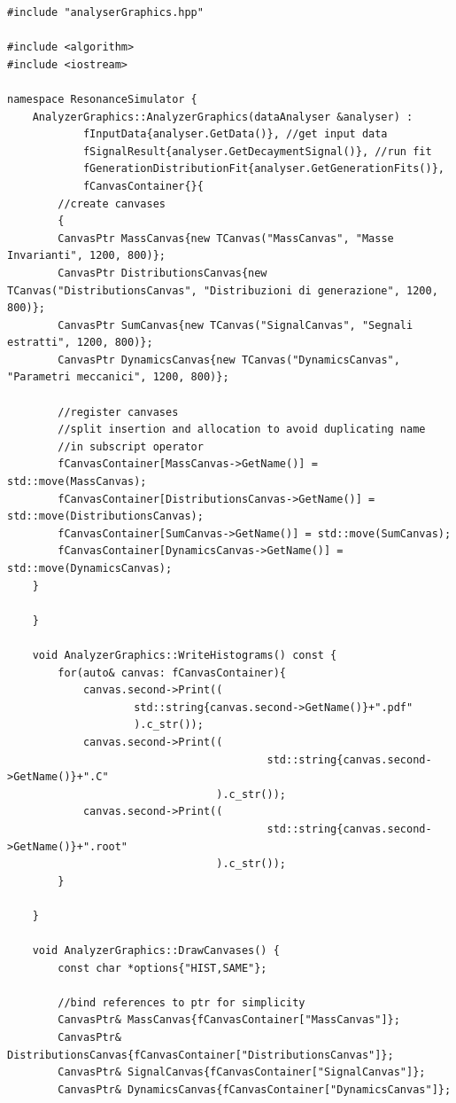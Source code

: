 \documentclass[12pt, a4paper]{article}
\begin{document}
\begin{verbatim}
#include "analyserGraphics.hpp"

#include <algorithm>
#include <iostream>

namespace ResonanceSimulator {
    AnalyzerGraphics::AnalyzerGraphics(dataAnalyser &analyser) :
            fInputData{analyser.GetData()}, //get input data
            fSignalResult{analyser.GetDecaymentSignal()}, //run fit
            fGenerationDistributionFit{analyser.GetGenerationFits()},
            fCanvasContainer{}{
        //create canvases
        {
        CanvasPtr MassCanvas{new TCanvas("MassCanvas", "Masse Invarianti", 1200, 800)};
        CanvasPtr DistributionsCanvas{new TCanvas("DistributionsCanvas", "Distribuzioni di generazione", 1200, 800)};
        CanvasPtr SumCanvas{new TCanvas("SignalCanvas", "Segnali estratti", 1200, 800)};
        CanvasPtr DynamicsCanvas{new TCanvas("DynamicsCanvas", "Parametri meccanici", 1200, 800)};

        //register canvases
        //split insertion and allocation to avoid duplicating name
        //in subscript operator
        fCanvasContainer[MassCanvas->GetName()] = std::move(MassCanvas);
        fCanvasContainer[DistributionsCanvas->GetName()] = std::move(DistributionsCanvas);
        fCanvasContainer[SumCanvas->GetName()] = std::move(SumCanvas);
        fCanvasContainer[DynamicsCanvas->GetName()] = std::move(DynamicsCanvas);
    }

    }

    void AnalyzerGraphics::WriteHistograms() const {
        for(auto& canvas: fCanvasContainer){
            canvas.second->Print((
                    std::string{canvas.second->GetName()}+".pdf"
                    ).c_str());
            canvas.second->Print((
                                         std::string{canvas.second->GetName()}+".C"
                                 ).c_str());
            canvas.second->Print((
                                         std::string{canvas.second->GetName()}+".root"
                                 ).c_str());
        }

    }

    void AnalyzerGraphics::DrawCanvases() {
        const char *options{"HIST,SAME"};

        //bind references to ptr for simplicity
        CanvasPtr& MassCanvas{fCanvasContainer["MassCanvas"]};
        CanvasPtr& DistributionsCanvas{fCanvasContainer["DistributionsCanvas"]};
        CanvasPtr& SignalCanvas{fCanvasContainer["SignalCanvas"]};
        CanvasPtr& DynamicsCanvas{fCanvasContainer["DynamicsCanvas"]};


\end{verbatim}
\end{document}
